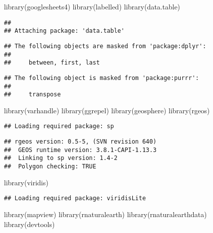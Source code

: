 \documentclass[
]{article}
\newenvironment{Shaded}{\begin{snugshade}}{\end{snugshade}}
\newcommand{\FunctionTok}[1]{\textcolor[rgb]{0.00,0.00,0.00}{#1}}
\newcommand{\NormalTok}[1]{#1}
\begin{document}
\begin{Shaded}
\begin{Highlighting}[]
\FunctionTok{library}\NormalTok{(googlesheets4)}
\FunctionTok{library}\NormalTok{(labelled)}
\FunctionTok{library}\NormalTok{(data.table)}
\end{Highlighting}
\end{Shaded}

\begin{verbatim}
## 
## Attaching package: 'data.table'
\end{verbatim}

\begin{verbatim}
## The following objects are masked from 'package:dplyr':
## 
##     between, first, last
\end{verbatim}

\begin{verbatim}
## The following object is masked from 'package:purrr':
## 
##     transpose
\end{verbatim}

\begin{Shaded}
\begin{Highlighting}[]
\FunctionTok{library}\NormalTok{(varhandle)}
\FunctionTok{library}\NormalTok{(ggrepel)}
\FunctionTok{library}\NormalTok{(geosphere)}
\FunctionTok{library}\NormalTok{(rgeos)}
\end{Highlighting}
\end{Shaded}

\begin{verbatim}
## Loading required package: sp
\end{verbatim}

\begin{verbatim}
## rgeos version: 0.5-5, (SVN revision 640)
##  GEOS runtime version: 3.8.1-CAPI-1.13.3 
##  Linking to sp version: 1.4-2 
##  Polygon checking: TRUE
\end{verbatim}

\begin{Shaded}
\begin{Highlighting}[]
\FunctionTok{library}\NormalTok{(viridis)}
\end{Highlighting}
\end{Shaded}

\begin{verbatim}
## Loading required package: viridisLite
\end{verbatim}

\begin{Shaded}
\begin{Highlighting}[]
\FunctionTok{library}\NormalTok{(mapview)}
\FunctionTok{library}\NormalTok{(rnaturalearth)}
\FunctionTok{library}\NormalTok{(rnaturalearthdata)}
\FunctionTok{library}\NormalTok{(devtools)}
\end{Highlighting}
\end{Shaded}
\end{document}
